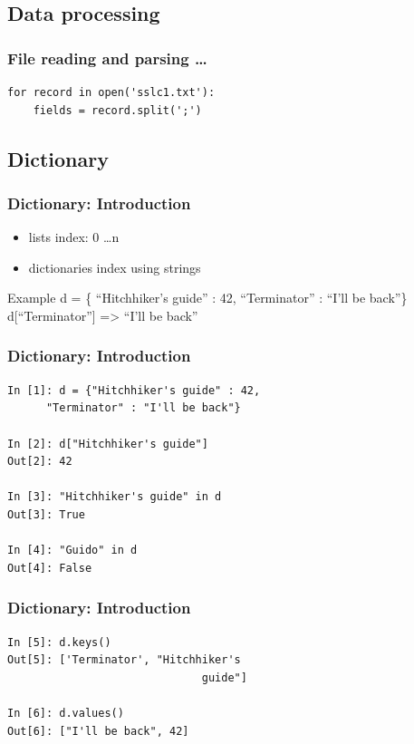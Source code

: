 \documentclass[14pt,compress]{beamer}
\begin{document}
\subsection{Data processing}
\begin{frame}[fragile]
  \frametitle{File reading and parsing \ldots}
  \begin{lstlisting}
for record in open('sslc1.txt'):
    fields = record.split(';')
  \end{lstlisting}
\end{frame}

\subsection{Dictionary}
\begin{frame}[fragile]
  \frametitle{Dictionary: Introduction}
  \begin{itemize}
    \item lists index: 0 \ldots n
    \item dictionaries index using strings
  \end{itemize}
  \begin{block}{Example}
d = \{ ``Hitchhiker's guide'' : 42,
     ``Terminator'' : ``I'll be back''\}\\
d[``Terminator''] => ``I'll be back''
  \end{block}
\end{frame}

\begin{frame}[fragile]
  \frametitle{Dictionary: Introduction}
  \begin{lstlisting}
In [1]: d = {"Hitchhiker's guide" : 42,
      "Terminator" : "I'll be back"}

In [2]: d["Hitchhiker's guide"]
Out[2]: 42

In [3]: "Hitchhiker's guide" in d
Out[3]: True

In [4]: "Guido" in d
Out[4]: False
  \end{lstlisting}
\end{frame}

\begin{frame}[fragile]
  \frametitle{Dictionary: Introduction}
  \begin{lstlisting}
In [5]: d.keys()
Out[5]: ['Terminator', "Hitchhiker's 
                              guide"]

In [6]: d.values()
Out[6]: ["I'll be back", 42]
  \end{lstlisting}
\end{frame}
\end{document}
